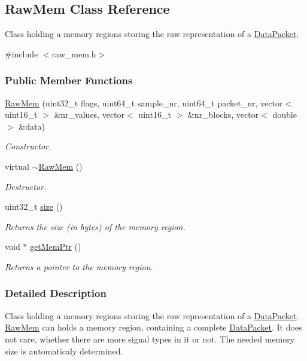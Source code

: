 \hypertarget{class_raw_mem}{
\subsection{RawMem Class Reference}
\label{class_raw_mem}
}


Class holding a memory regions storing the raw representation of a \hyperlink{class_data_packet}{DataPacket}.  


{\ttfamily \#include $<$raw\_\-mem.h$>$}\subsubsection*{Public Member Functions}
\begin{DoxyCompactItemize}
\item 
\hyperlink{class_raw_mem_af74aadbde2ea7d30cd721a7ece0e79d7}{RawMem} (uint32\_\-t flags, uint64\_\-t sample\_\-nr, uint64\_\-t packet\_\-nr, vector$<$ uint16\_\-t $>$ \&nr\_\-values, vector$<$ uint16\_\-t $>$ \&nr\_\-blocks, vector$<$ double $>$ \&data)
\begin{DoxyCompactList}\small\item\em Constructor. \item\end{DoxyCompactList}\item 
virtual \hyperlink{class_raw_mem_a05eb832829e39e65c31567fa4d419e31}{$\sim$RawMem} ()
\begin{DoxyCompactList}\small\item\em Destructor. \item\end{DoxyCompactList}\item 
uint32\_\-t \hyperlink{class_raw_mem_a07bb8d59d7f06f3a05df00ec8ab1aff9}{size} ()
\begin{DoxyCompactList}\small\item\em Returns the size (in bytes) of the memory region. \item\end{DoxyCompactList}\item 
void $\ast$ \hyperlink{class_raw_mem_ada23879e8477b62fb50a2e09d99a1685}{getMemPtr} ()
\begin{DoxyCompactList}\small\item\em Returns a pointer to the memory region. \item\end{DoxyCompactList}\end{DoxyCompactItemize}


\subsubsection{Detailed Description}
Class holding a memory regions storing the raw representation of a \hyperlink{class_data_packet}{DataPacket}. \hyperlink{class_raw_mem}{RawMem} can holds a memory region, containing a complete \hyperlink{class_data_packet}{DataPacket}. It does not care, whether there are more signal types in it or not. The needed memory size is automaticaly determined. 

